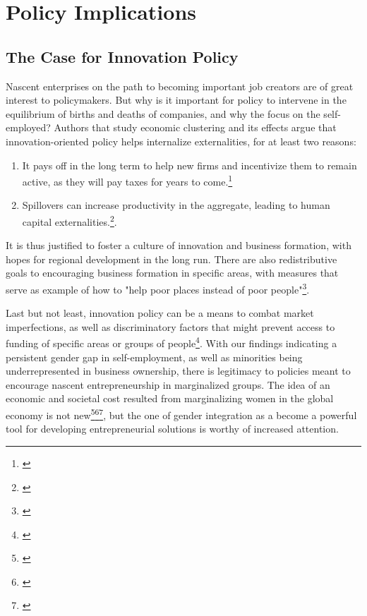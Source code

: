 \chapter{Policy Implications\label{ch:policy}}

\section{The Case for Innovation Policy}

Nascent enterprises on the path to becoming important job creators are of great interest to policymakers. But why is it important for policy to intervene in the equilibrium of births and deaths of companies, and why the focus on the self-employed? Authors that study economic clustering and its effects argue that innovation-oriented policy helps internalize externalities, for at least two reasons: 

\renewcommand{\labelenumi}{\roman{enumi}}
\begin{enumerate}
\item It pays off in the long term to help new firms and incentivize them to remain active, as they will pay taxes for years to come.\footnote{\cite{ChatterjiGlaeserKerr2014}}
\item Spillovers can increase productivity in the aggregate, leading to human capital externalities.\footnote{\cite{Moretti2004}}. 
\end{enumerate}

It is thus justified to foster a culture of innovation and business formation, with hopes for regional development in the long run. There are also redistributive goals to encouraging business formation in specific areas, with measures that serve as example of how to "help poor places instead of poor people"\footnote{\cite{ChatterjiGlaeserKerr2014}}. 

Last but not least, innovation policy can be a means to combat market imperfections, as well as discriminatory factors that might prevent access to funding of specific areas or groups of people\footnote{\cite{ChatterjiGlaeserKerr2014}}. With our findings indicating a persistent gender gap in self-employment, as well as minorities being underrepresented in business ownership, there is legitimacy to policies meant to encourage nascent entrepreneurship in marginalized groups. The idea of an economic and societal cost resulted from marginalizing women in the global economy is not new\footnote{\cite{bakker1994strategic}}\hspace{.15em}\footnote{\cite{blank1993should}}\hspace{.15em}\footnote{\cite{boserup1970women}}, but the one of gender integration as a become a powerful tool for developing entrepreneurial solutions is worthy of increased attention.  

